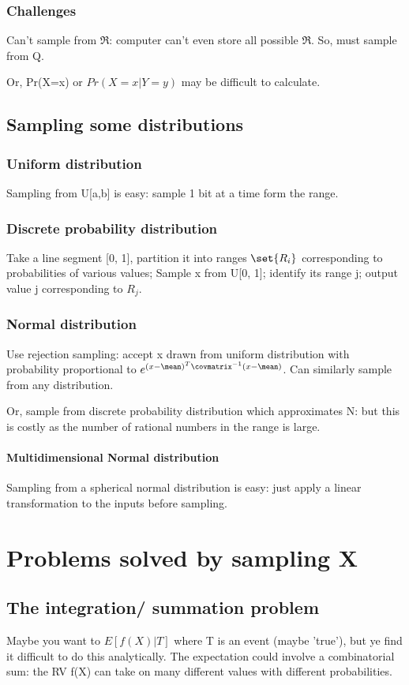 \documentclass[oneside, article]{memoir}
\begin{document}
\subsubsection{Challenges}
Can't sample from $\Re$: computer can't even store all possible $\Re$. So, must sample from Q.

Or, Pr(X=x) or $Pr(X=x|Y=y)$ may be difficult to calculate.

\subsection{Sampling some distributions}
\subsubsection{Uniform distribution}
Sampling from U[a,b] is easy: sample 1 bit at a time form the range.

\subsubsection{Discrete probability distribution}
Take a line segment [0, 1], partition it into ranges $\set{R_i}$ corresponding to probabilities of various values; Sample x from U[0, 1]; identify its range j; output value j corresponding to $R_j$.

\subsubsection{Normal distribution}
Use rejection sampling: accept x drawn from uniform distribution with probability proportional to $e^{(x-\mean)^{T}\covmatrix^{-1}(x-\mean)}$. Can similarly sample from any distribution.

Or, sample from discrete probability distribution which approximates N: but this is costly as the number of rational numbers in the range is large.

\paragraph*{Multidimensional Normal distribution}
Sampling from a spherical normal distribution is easy: just apply a linear transformation to the inputs before sampling.

\section{Problems solved by sampling X}
\subsection{The integration/ summation problem}
Maybe you want to $E[f(X)|T]$ where T is an event (maybe 'true'), but ye find it difficult to do this analytically. The expectation could involve a combinatorial sum: the RV f(X) can take on many different values with different probabilities.
\end{document}
